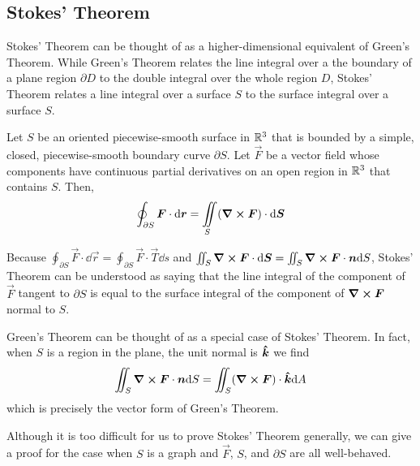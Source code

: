 \subsection{Stokes' Theorem}
Stokes' Theorem can be thought of as a higher-dimensional equivalent of Green's Theorem. While Green's Theorem relates the line integral over a the boundary of a plane region $\partial D$ to the double integral over the whole region $D$, Stokes' Theorem relates a line integral over a surface $S$ to the surface integral over a surface $S$.
\begin{theorem}
    Let $S$ be an oriented piecewise-smooth surface in $\mathbb{R}^3$ that is bounded by a simple, closed, piecewise-smooth boundary curve $\partial S$. Let $\vec F$ be a vector field whose components have continuous partial derivatives on an open region in $\mathbb{R}^3$ that contains $S$. Then,
    \[ \oint_{\partial S} \boldsymbol{F} \cdot \dd \boldsymbol{r} = \iint\limits_S (\curl \boldsymbol{F}) \cdot \dd \boldsymbol{S}\]
\end{theorem}
Because $\oint_{\partial S} \vec F \cdot \dd \vec r = \oint_{\partial S} \vec F \cdot \vec T \dd s$ and $\iint_S \curl \boldsymbol{F} \cdot \dd \boldsymbol{S} = \iint_S \curl \boldsymbol{F} \cdot \boldsymbol{n} \dd S$, Stokes' Theorem can be understood as saying that the line integral of the component of $\vec F$ tangent to $\partial S$ is equal to the surface integral of the component of $\curl \boldsymbol{F}$ normal to $S$. \par
Green's Theorem can be thought of as a special case of Stokes' Theorem. In fact, when $S$ is a region in the plane, the unit normal is $\boldsymbol{\hat{k}}$ we find
\[ \iint_S \curl \boldsymbol{F} \cdot \boldsymbol{n} \dd S = \iint_S (\curl \boldsymbol{F}) \cdot \boldsymbol{\hat{k}} \dd A \]
which is precisely the vector form of Green's Theorem. \par
Although it is too difficult for us to prove Stokes' Theorem generally, we can give a proof for the case when $S$ is a graph and $\vec F$, $S$, and $\partial S$ are all well-behaved.
